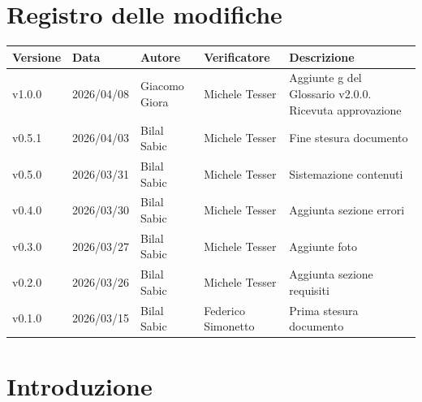 \documentclass[a4paper,12pt]{article}
\newcommand{\DataUltimaModifica}{2026/04/08}
\newcommand{\VersioneDocumento}{v1.0.0}
\begin{document}
\section*{Registro delle modifiche}
\begin{center}
    \begin{tabularx}{\textwidth}{|l|l|l|X|X|}
        \hline
        \rowcolor{lightgray}
        \textbf{Versione}  & \textbf{Data}       & \textbf{Autore}      & \textbf{Verificatore} & \textbf{Descrizione}  \\
        \hline
        \VersioneDocumento & \DataUltimaModifica & Giacomo Giora & Michele Tesser & Aggiunte g del Glossario v2.0.0. Ricevuta approvazione \\
        \hline
        v0.5.1 & 2026/04/03 & Bilal Sabic & Michele Tesser & Fine stesura \newline documento \\
        \hline
        v0.5.0 & 2026/03/31 & Bilal Sabic & Michele Tesser & Sistemazione contenuti \\
        \hline
        v0.4.0 & 2026/03/30 & Bilal Sabic & Michele Tesser & Aggiunta sezione \newline errori \\
        \hline
        v0.3.0 & 2026/03/27 & Bilal Sabic & Michele Tesser & Aggiunte foto \\
        \hline
        v0.2.0 & 2026/03/26 & Bilal Sabic & Michele Tesser & Aggiunta sezione \newline requisiti \\
        \hline
        v0.1.0 & 2026/03/15 & Bilal Sabic & Federico Simonetto & Prima stesura \newline documento \\
        \hline
    \end{tabularx}
\end{center}

\newpage

\tableofcontents

\newpage

\listoffigures



\newpage

\section{Introduzione}
\end{document}
